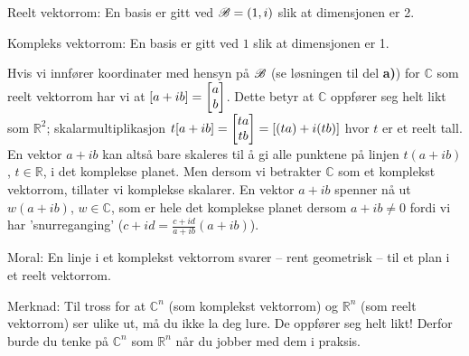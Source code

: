 \begin{losning}
\begin{punkt}
Reelt vektorrom: En basis er gitt ved $\mathscr{B}=(1,i)$ slik at dimensjonen er 2.

\noindent
Kompleks vektorrom: En basis er gitt ved $1$ slik at dimensjonen er 1.
\end{punkt}

\begin{punkt}
Hvis vi innfører koordinater med hensyn på $\mathscr{B}$ (se løsningen til del \textbf{a)}) for $\mathbb{C}$ som reelt vektorrom har vi at $[a+ib]=\begin{bmatrix} a \\ b \end{bmatrix}$. Dette betyr at $\mathbb{C}$ oppfører seg helt likt som $\mathbb{R}^2$; skalarmultiplikasjon $t[a+ib]=\begin{bmatrix} ta \\ tb \end{bmatrix}=[(ta)+i(tb)]$ hvor $t$ er et reelt tall. En vektor $a+ib$ kan altså bare skaleres til å gi alle punktene på linjen $t(a+ib)$, $t\in\mathbb{R}$, i det komplekse planet. Men dersom vi betrakter $\mathbb{C}$ som et komplekst vektorrom, tillater vi komplekse skalarer. En vektor $a+ib$ spenner nå ut $w(a+ib)$, $w\in \mathbb{C}$, som er hele det komplekse planet dersom $a+ib\neq 0$ fordi vi har 'snurreganging' ($c+id=\frac{c+id}{a+ib}(a+ib)$).

\noindent
Moral: En linje i et komplekst vektorrom svarer -- rent geometrisk -- til et plan i et reelt vektorrom. 

\noindent
Merknad: Til tross for at $\mathbb{C}^n$ (som komplekst vektorrom) og $\mathbb{R}^n$ (som reelt vektorrom) ser ulike ut, må du ikke la deg lure. De oppfører seg helt likt! Derfor burde du tenke på $\mathbb{C}^n$ som $\mathbb{R}^n$ når du jobber med dem i praksis. 
\end{punkt}

\end{losning}
